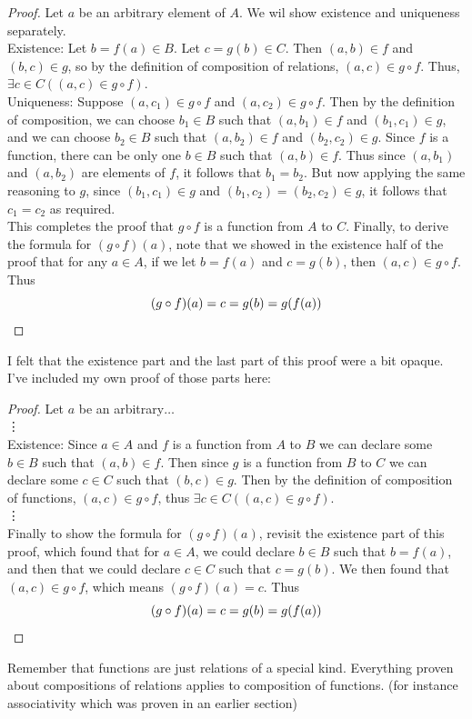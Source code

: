\documentclass{report}
\theoremstyle{definition}
\begin{document}
\begin{proof}
Let $a$ be an arbitrary element of $A$. We wil show existence and uniqueness separately.\\
\indent Existence: Let $b=f(a)\in B$. Let $c=g(b)\in C$. Then $(a,b)\in f$ and $(b,c)\in g$, so by the definition of composition of relations, $(a,c)\in g\circ f$. Thus, 
$\exists c\in C((a,c)\in g\circ f)$.\\
\indent Uniqueness: Suppose $(a,c_1)\in g\circ f$ and $(a,c_2)\in g\circ f$. Then by the definition
of composition, we can choose $b_1\in B$ such that $(a,b_1)\in f$ and $(b_1,c_1)\in g$, and we can
choose $b_2\in B$ such that $(a,b_2)\in f$ and $(b_2,c_2)\in g$. Since $f$ is a function, there can be only one $b\in B$ such that $(a,b)\in f$. Thus since $(a,b_1)$ and $(a,b_2)$ are elements of 
$f$, it follows that $b_1=b_2$. But now applying the same reasoning to $g$, since $(b_1,c_1)\in g$ and $(b_1,c_2)=(b_2,c_2)\in g$, it follows that $c_1=c_2$ as required.\\
\indent This completes the proof that $g\circ f$ is a function from $A$ to $C$. Finally, to derive the formula for $(g\circ f)(a)$, note that we showed in the existence half of the proof 
that for any $a\in A$, if we let $b=f(a)$ and $c=g(b)$, then $(a,c)\in g\circ f$. Thus
\begin{equation*}
(g\circ f)(a)=c=g(b)=g(f(a))\qedhere
\end{equation*}
\end{proof}
\noindent I felt that the existence part and the last part of this proof were a bit opaque. I've included my own proof of those parts here:
\begin{proof}Let $a$ be an arbitrary$\ldots$\\
\indent\vdots\\
\indent Existence: Since $a\in A$ and $f$ is a function from $A$ to $B$ we can declare some $b\in B$ such that $(a,b)\in f$. Then since $g$ is a function from $B$ to $C$ we can declare some $c\in C$ such
that $(b,c)\in g$. Then by the definition of composition of functions, $(a,c)\in g\circ f$, thus $\exists c\in C((a,c)\in g\circ f)$.\\
\indent\vdots\\
\indent Finally to show the formula for $(g\circ f)(a)$, revisit the existence part of this proof, which found that for $a\in A$, we could declare $b\in B$ such that $b=f(a)$, and then that we could
declare $c\in C$ such that $c=g(b)$. We then found that $(a,c)\in g\circ f$, which means 
$(g\circ f)(a)=c$. Thus
\begin{equation*}
(g\circ f)(a)=c=g(b)=g(f(a))\qedhere
\end{equation*}
\end{proof}
\noindent Remember that functions are just relations of a special kind. Everything proven about compositions of relations applies to composition of functions. (for instance associativity which 
was proven in an earlier section)
\newpage
\end{document}

